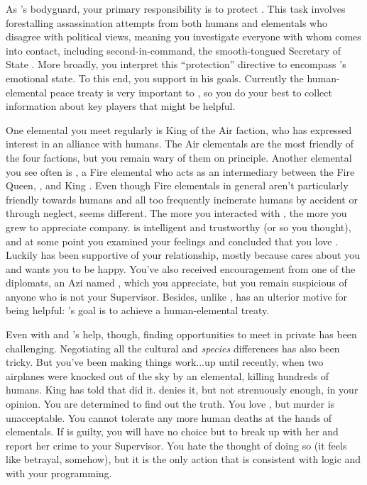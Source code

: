 \documentclass[char]{elementals}
\begin{document}
As \cLeader{}'s bodyguard, your primary responsibility is to protect \cLeader{\them}.  This task involves forestalling assassination attempts from both humans and elementals who disagree with \cLeader{\their} political views, meaning you investigate everyone with whom \cLeader{\they} comes into contact, including \cLeader{\their} second-in-command, the smooth-tongued Secretary of State \cDema{\intro}.  More broadly, you interpret this ``protection'' directive to encompass \cLeader{}'s emotional state.  To this end, you support \cLeader{\them} in his goals.  Currently the human-elemental peace treaty is very important to \cLeader{\them}, so you do your best to collect information about key players that might be helpful.

One elemental you meet regularly is King \cKing{\intro} of the Air faction, who has expressed interest in an alliance with humans.  The Air elementals are the most friendly of the four factions, but you remain wary of them on principle.  Another elemental you see often is \cJuliet{\intro}, a Fire elemental who acts as an intermediary between the Fire Queen, \cQueen{\intro}, and King \cKing{}.  Even though Fire elementals in general aren't particularly friendly towards humans and all too frequently incinerate humans by accident or through neglect, \cJuliet{} seems different.  The more you interacted with \cJuliet{\them}, the more you grew to appreciate \cJuliet{\their} company.  \cJuliet{\They} is intelligent and trustworthy (or so you thought), and at some point you examined your feelings and concluded that you love \cJuliet{\them}.  Luckily \cLeader{} has been supportive of your relationship, mostly because \cLeader{\they} cares about you and wants you to be happy.  You've also received encouragement from one of the diplomats, an Azi named \cDiplomat{\intro}, which you appreciate, but you remain suspicious of anyone who is not your Supervisor.  Besides, unlike \cLeader{}, \cDiplomat{\they} has an ulterior motive for being helpful: \cDiplomat{}'s goal is to achieve a human-elemental treaty.

Even with \cLeader{} and \cDiplomat{}'s help, though, finding opportunities to meet \cJuliet{} in private has been challenging.  Negotiating all the cultural and \emph{species} differences has also been tricky.   But you've been making things work...up until recently, when two airplanes were knocked out of the sky by an elemental, killing hundreds of humans.  King \cKing{} has told \cLeader{} that \cJuliet{} did it.  \cJuliet{\They} denies it, but not strenuously enough, in your opinion.  You are determined to find out the truth.  You love \cJuliet{\them}, but murder is unacceptable.  You cannot tolerate any more human deaths at the hands of elementals.  If \cJuliet{\they} is guilty, you will have no choice but to break up with her and report her crime to your Supervisor.  You hate the thought of doing so (it feels like betrayal, somehow), but it is the only action that is consistent with logic and with your programming.
\end{document}
